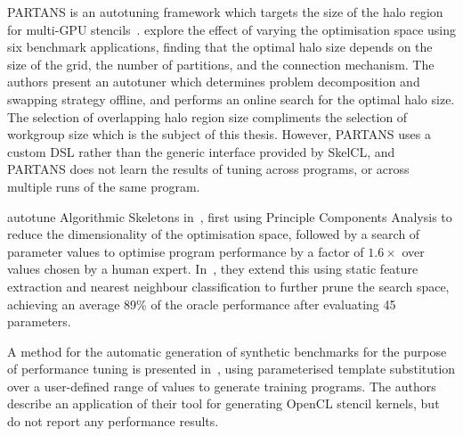 \documentclass[preprint,nonatbib,10pt]{sigplanconf}
\begin{document}

PARTANS is an autotuning framework which targets the size of the halo
region for multi-GPU stencils~\cite{Lutz2013}. \citeauthor{Lutz2013}
explore the effect of varying the optimisation space using six
benchmark applications, finding that the optimal halo size depends on
the size of the grid, the number of partitions, and the connection
mechanism. The authors present an autotuner which determines problem
decomposition and swapping strategy offline, and performs an online
search for the optimal halo size. The selection of overlapping halo
region size compliments the selection of workgroup size which is the
subject of this thesis. However, PARTANS uses a custom DSL rather than
the generic interface provided by SkelCL, and PARTANS does not learn
the results of tuning across programs, or across multiple runs of the
same program.

\citeauthor{Collins2012} autotune Algorithmic Skeletons
in~\cite{Collins2012}, first using Principle Components Analysis to
reduce the dimensionality of the optimisation space, followed by a
search of parameter values to optimise program performance by a factor
of $1.6\times$ over values chosen by a human
expert. In~\cite{Collins2013}, they extend this using static feature
extraction and nearest neighbour classification to further prune the
search space, achieving an average 89\% of the oracle performance
after evaluating 45 parameters.

A method for the automatic generation of synthetic benchmarks for the
purpose of performance tuning is presented in~\cite{Chiu2015}, using
parameterised template substitution over a user-defined range of
values to generate training programs. The authors describe an
application of their tool for generating OpenCL stencil kernels, but
do not report any performance results.
\end{document}
